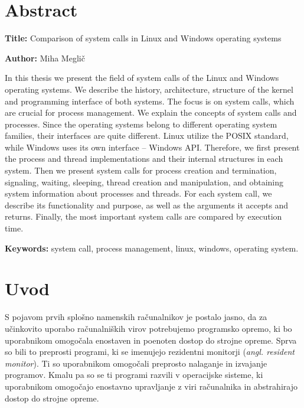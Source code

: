 \documentclass[a4paper,12pt,openright]{book}
\newcommand{\ttitleEn}{Comparison of system calls in Linux and Windows operating systems}
\newcommand{\tauthor}{Miha Meglič}
\newcommand{\tkeywordsEn}{system call, process management, linux, windows, operating system}
\newcommand{\clearemptydoublepage}{\newpage{\pagestyle{empty}\cleardoublepage}}
\begin{document}
\chapter*{Abstract}

\noindent\textbf{Title:} \ttitleEn
\bigskip

\noindent\textbf{Author:} \tauthor
\bigskip

\noindent In this thesis we present the field of system calls of the Linux and Windows operating systems.
We describe the history, architecture, structure of the kernel and programming interface of both systems.
The focus is on system calls, which are crucial for process management.
We explain the concepts of system calls and processes.
Since the operating systems belong to different operating system families, their interfaces are quite different.
Linux utilize the POSIX standard, while Windows uses its own interface -- Windows API.
Therefore, we first present the process and thread implementations and their internal structures in each system.
Then we present system calls for process creation and termination, signaling, waiting, sleeping, thread creation and manipulation, and obtaining system information about processes and threads.
For each system call, we describe its functionality and purpose, as well as the arguments it accepts and returns.
Finally, the most important system calls are compared by execution time.

\bigskip

\noindent\textbf{Keywords:} \tkeywordsEn.
\clearemptydoublepage

\mainmatter
\setcounter{page}{1}
\pagestyle{fancy}

\chapter{Uvod}

S pojavom prvih splošno namenskih računalnikov je postalo jasno, da za učinkovito uporabo računalniških virov potrebujemo programsko opremo, ki bo uporabnikom omogočala enostaven in poenoten dostop do strojne opreme.
Sprva so bili to preprosti programi, ki se imenujejo rezidentni monitorji (\textit{angl. resident monitor}).
Ti so uporabnikom omogočali preprosto nalaganje in izvajanje programov.
Kmalu pa so se ti programi razvili v operacijske sisteme, ki uporabnikom omogočajo enostavno upravljanje z viri računalnika in abstrahirajo dostop do strojne opreme.
\end{document}
